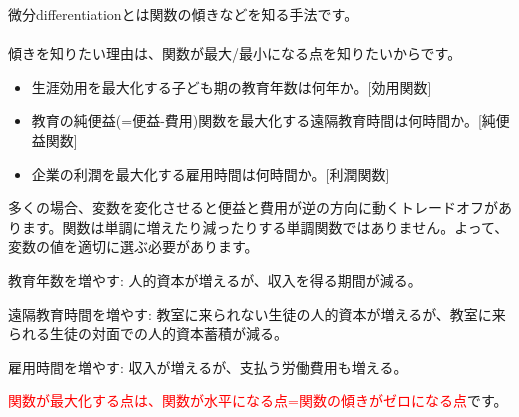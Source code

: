 \def\Perp{\mkern2mu\rotatebox[origin=c]{90}{$\models$}\mkern2mu}

\begin{frame}[t]{}
微分differentiationとは関数の傾きなどを知る手法です。\\~\\

\pause
傾きを知りたい理由は、関数が最大/最小になる点を知りたいからです。
\begin{itemize}\footnotesize
\vspace{1.0ex}\setlength{\itemsep}{1.0ex}\setlength{\baselineskip}{12pt}
\pause
\item	生涯効用を最大化する子ども期の教育年数は何年か。[効用関数]
\pause
\item	教育の純便益(=便益-費用)関数を最大化する遠隔教育時間は何時間か。[純便益関数]
\pause
\item	企業の利潤を最大化する雇用時間は何時間か。[利潤関数]\\[2ex]
\end{itemize}
\pause
多くの場合、変数を変化させると便益と費用が逆の方向に動くトレードオフがあります。関数は単調に増えたり減ったりする単調関数ではありません。よって、変数の値を適切に選ぶ必要があります。
\begin{dinglist}{43}\footnotesize
\vspace{1.0ex}\setlength{\itemsep}{1.0ex}\setlength{\baselineskip}{12pt}
\pause
\item	教育年数を増やす: 人的資本が増えるが、収入を得る期間が減る。
\pause
\item	遠隔教育時間を増やす: 教室に来られない生徒の人的資本が増えるが、教室に来られる生徒の対面での人的資本蓄積が減る。
\pause
\item	雇用時間を増やす: 収入が増えるが、支払う労働費用も増える。\\[2ex]
\end{dinglist}
\pause
\textcolor{red}{関数が最大化する点は、関数が水平になる点=関数の傾きがゼロになる点}です。
\end{frame}

